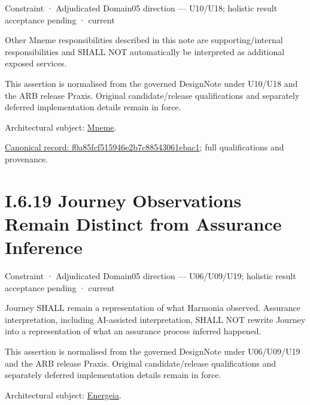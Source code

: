 \label{element:f0a85fcf515946e2b7c88543061ebac1}
{\small Constraint · Adjudicated Domain05 direction — U10/U18; holistic result acceptance pending · current}\par

Other Mneme responsibilities described in this note are supporting/internal responsibilities and SHALL NOT automatically be interpreted as additional exposed services.



This assertion is normalised from the governed DesignNote under U10/U18 and the ARB release Praxis. Original candidate/release qualifications and separately deferred implementation details remain in force.



Architectural subject: \hyperref[element:1af8a56358f7429fabfb57be66542a99]{Mneme}.


{\footnotesize \href{../../../../../../../continuum/motivation/constraint/f0a85fcf515946e2b7c88543061ebac1.md}{Canonical record: f0a85fcf515946e2b7c88543061ebac1}; full qualifications and provenance.}\par
\section*{I.6.19 Journey Observations Remain Distinct from Assurance Inference}
\label{navigation:I.6.19}

\label{element:ae2fa71039034290b019eb1cc6eb1996}
{\small Constraint · Adjudicated Domain05 direction — U06/U09/U19; holistic result acceptance pending · current}\par

Journey SHALL remain a representation of what Harmonia observed. Assurance interpretation, including AI-assisted interpretation, SHALL NOT rewrite Journey into a representation of what an assurance process inferred happened.



This assertion is normalised from the governed DesignNote under U06/U09/U19 and the ARB release Praxis. Original candidate/release qualifications and separately deferred implementation details remain in force.



Architectural subject: \hyperref[element:fb3f37a6ac614415ac486a6de9d35994]{Energeia}.


